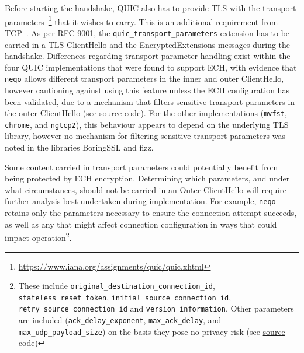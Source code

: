 Before starting the handshake, QUIC also has to provide TLS with the transport parameters~\footnote{\url{https://www.iana.org/assignments/quic/quic.xhtml}} that it wishes to carry. This is an additional requirement from TCP~\cite{rfc9000}. As per RFC 9001, the \texttt{quic\_transport\_parameters} extension has to be carried in a TLS ClientHello and the EncryptedExtensions messages during the handshake.
Differences regarding transport parameter handling exist within the four QUIC implementations that were found to support ECH, with evidence that \texttt{neqo} allows different transport parameters in the inner and outer ClientHello, however cautioning against using this feature unless the ECH configuration has been validated, due to a mechanism that filters sensitive transport parameters in the outer ClientHello (see \href{https://github.com/mozilla/neqo/blob/main/neqo-crypto/src/agent.rs#L1176-L1182}{source code}).
For the other implementations (\texttt{mvfst}, \texttt{chrome}, and \texttt{ngtcp2}), this behaviour appears to depend on the underlying TLS library, however no mechanism for filtering sensitive transport parameters was noted in the libraries BoringSSL and fizz.


Some content carried in transport parameters could potentially benefit from being protected by ECH encryption. Determining which parameters, and under what circumstances, should not be carried in an Outer ClientHello will require further analysis best undertaken during implementation.
For example, \texttt{neqo} retains only the parameters necessary to ensure the connection attempt succeeds, as well as any that might affect connection configuration in ways that could impact operation\footnote{These include \texttt{original\_destination\_connection\_id}, \texttt{stateless\_reset\_token}, \texttt{initial\_source\_connection\_id}, \texttt{retry\_source\_connection\_id} and \texttt{version\_information}. Other parameters are included (\texttt{ack\_delay\_exponent}, \texttt{max\_ack\_delay}, and \texttt{max\_udp\_payload\_size}) on the basis they pose no privacy risk (see \href{https://github.com/mozilla/neqo/blob/d46f3f4a9454bb50fc40f6251b43d43442a5db00/neqo-transport/src/tparams.rs\#L749-L782}{source code})}.
